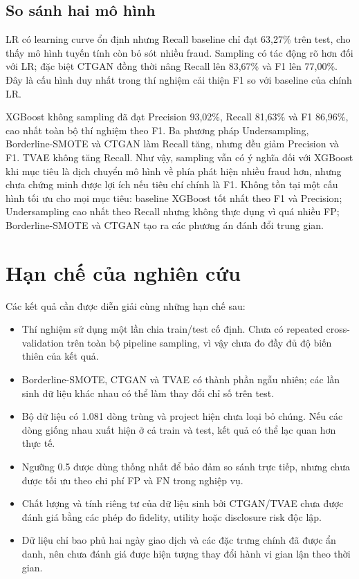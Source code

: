 \documentclass[12pt,a4paper]{article}
\begin{document}
\subsection{So sánh hai mô hình}

LR có learning curve ổn định nhưng Recall baseline chỉ đạt 63,27\% trên test, cho thấy mô hình tuyến tính còn bỏ sót nhiều fraud. Sampling có tác động rõ hơn đối với LR; đặc biệt CTGAN đồng thời nâng Recall lên 83,67\% và F1 lên 77,00\%. Đây là cấu hình duy nhất trong thí nghiệm cải thiện F1 so với baseline của chính LR.

XGBoost không sampling đã đạt Precision 93,02\%, Recall 81,63\% và F1 86,96\%, cao nhất toàn bộ thí nghiệm theo F1. Ba phương pháp Undersampling, Borderline-SMOTE và CTGAN làm Recall tăng, nhưng đều giảm Precision và F1. TVAE không tăng Recall. Như vậy, sampling vẫn có ý nghĩa đối với XGBoost khi mục tiêu là dịch chuyển mô hình về phía phát hiện nhiều fraud hơn, nhưng chưa chứng minh được lợi ích nếu tiêu chí chính là F1. Không tồn tại một cấu hình tối ưu cho mọi mục tiêu: baseline XGBoost tốt nhất theo F1 và Precision; Undersampling cao nhất theo Recall nhưng không thực dụng vì quá nhiều FP; Borderline-SMOTE và CTGAN tạo ra các phương án đánh đổi trung gian.

\section{Hạn chế của nghiên cứu}
\label{sec:limitations}

Các kết quả cần được diễn giải cùng những hạn chế sau:
\begin{itemize}
    \item Thí nghiệm sử dụng một lần chia train/test cố định. Chưa có repeated cross-validation trên toàn bộ pipeline sampling, vì vậy chưa đo đầy đủ độ biến thiên của kết quả.
    \item Borderline-SMOTE, CTGAN và TVAE có thành phần ngẫu nhiên; các lần sinh dữ liệu khác nhau có thể làm thay đổi chỉ số trên test.
    \item Bộ dữ liệu có 1.081 dòng trùng và project hiện chưa loại bỏ chúng. Nếu các dòng giống nhau xuất hiện ở cả train và test, kết quả có thể lạc quan hơn thực tế.
    \item Ngưỡng 0.5 được dùng thống nhất để bảo đảm so sánh trực tiếp, nhưng chưa được tối ưu theo chi phí FP và FN trong nghiệp vụ.
    \item Chất lượng và tính riêng tư của dữ liệu sinh bởi CTGAN/TVAE chưa được đánh giá bằng các phép đo fidelity, utility hoặc disclosure risk độc lập.
    \item Dữ liệu chỉ bao phủ hai ngày giao dịch và các đặc trưng chính đã được ẩn danh, nên chưa đánh giá được hiện tượng thay đổi hành vi gian lận theo thời gian.
\end{itemize}
\end{document}

